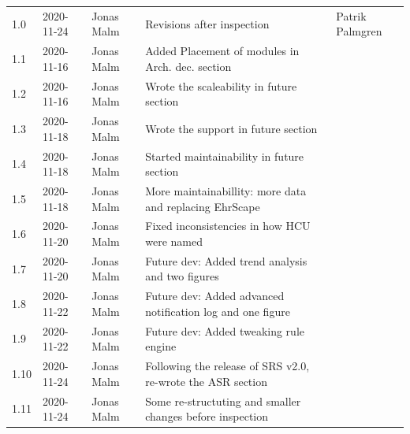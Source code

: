 \documentclass{article}
\begin{document}
\begin{table}
\begin{tabular}{|l|l|l|p{7cm}|p{3cm}|}
1.0 & 2020-11-24 & Jonas Malm & Revisions after inspection & Patrik Palmgren\\
1.1 & 2020-11-16 & Jonas Malm & Added Placement of modules in Arch. dec. section & \\
1.2 & 2020-11-16 & Jonas Malm & Wrote the scaleability in future section & \\
1.3 & 2020-11-18 & Jonas Malm & Wrote the support in future section & \\
1.4 & 2020-11-18 & Jonas Malm & Started maintainability in future section & \\
1.5 & 2020-11-18 & Jonas Malm & More maintainabillity: more data and replacing EhrScape & \\
1.6 & 2020-11-20 & Jonas Malm & Fixed inconsistencies in how HCU were named & \\
1.7 & 2020-11-20 & Jonas Malm & Future dev: Added trend analysis and two figures & \\
1.8 & 2020-11-22 & Jonas Malm & Future dev: Added advanced notification log and one figure & \\
1.9 & 2020-11-22 & Jonas Malm & Future dev: Added tweaking rule engine & \\
1.10 & 2020-11-24 & Jonas Malm & Following the release of SRS v2.0, re-wrote the ASR section & \\
1.11 & 2020-11-24 & Jonas Malm & Some re-structuting and smaller changes before inspection & \\ 
\hline
\end{tabular}
\end{table}
\end{document}
